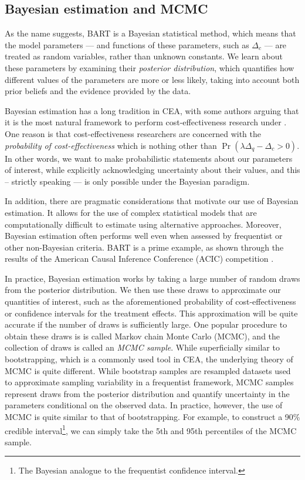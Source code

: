 \documentclass[aoas,preprint]{imsart}
\theoremstyle{plain}
\theoremstyle{definition}
\theoremstyle{remark}
\theoremstyle{remark}
\begin{document}
\subsection{Bayesian estimation and MCMC}
As the name suggests, BART is a Bayesian statistical method, which means that the model parameters --- and functions of these parameters, such as $\Delta_c$ --- are treated as random variables, rather than unknown constants. We learn about these parameters by examining their \emph{posterior distribution}, which quantifies how different values of the parameters are more or less likely, taking into account both prior beliefs and the evidence provided by the data. 

Bayesian estimation has a long tradition in CEA, with some authors arguing that it is the most natural framework to perform cost-effectiveness research under \citep{baio2018statistical}. One reason is that cost-effectiveness researchers are concerned with the \emph{probability of cost-effectiveness} which is nothing other than $\Pr(\lambda \Delta_q - \Delta_c > 0)$. In other words, we want to make probabilistic statements about our parameters of interest, while explicitly acknowledging uncertainty about their values, and this -- strictly speaking --- is only possible under the Bayesian paradigm. 

In addition, there are pragmatic considerations that motivate our use of Bayesian estimation. It allows for the use of complex statistical models that are computationally difficult to estimate using alternative approaches. Moreover, Bayesian estimation often performs well even when assessed by frequentist or other non-Bayesian criteria. BART is a prime example, as shown through the results of the American Causal Inference Conference (ACIC) competition \citep{dorie2019automated}.

In practice, Bayesian estimation works by taking a large number of random draws from the posterior distribution. We then use these draws to approximate our quantities of interest, such as the aforementioned probability of cost-effectiveness or confidence intervals for the treatment effects. This approximation will be quite accurate if the number of draws is sufficiently large. One popular procedure to obtain these draws is is called Markov chain Monte Carlo (MCMC), and the collection of draws is called an \emph{MCMC sample}. 
While superficially similar to bootstrapping, which is a commonly used tool in CEA, the underlying theory of MCMC is quite different. While bootstrap samples are resampled datasets used to approximate sampling variability in a frequentist framework, MCMC samples represent draws from the posterior distribution and quantify uncertainty in the parameters conditional on the observed data. In practice, however, the use of MCMC is quite similar to that of bootstrapping. For example, to construct a 90\% credible interval\footnote{The Bayesian analogue to the frequentist confidence interval.}, we can simply take the 5th and 95th percentiles of the MCMC sample.
\end{document}
